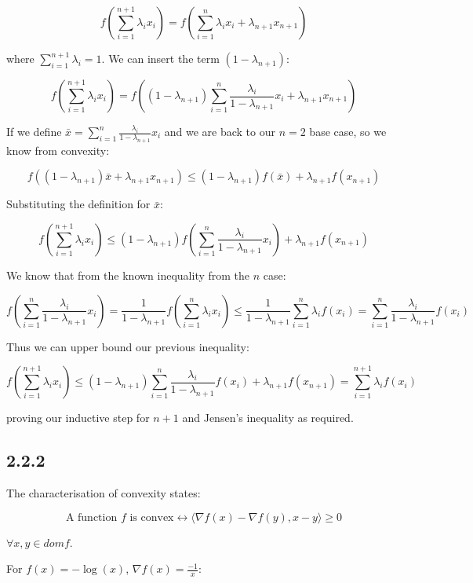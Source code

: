 \documentclass[12pt]{article}
\begin{document}
\[f\left(\sum_{i=1}^{n+1} \lambda_i x_i\right) = f\left(\sum_{i=1}^n \lambda_i x_i + \lambda_{n+1} x_{n+1}\right)\]

where $\sum_{i=1}^{n+1} \lambda_i = 1$. We can insert the term $(1-\lambda_{n+1})$:

\[f\left(\sum_{i=1}^{n+1} \lambda_i x_i\right) = f\left((1-\lambda_{n+1}) \sum_{i=1}^n \frac{\lambda_i}{1-\lambda_{n+1}} x_i + \lambda_{n+1} x_{n+1}\right)\]


If we define $\bar{x} = \sum_{i=1}^n \frac{\lambda_i}{1-\lambda_{n+1}} x_i$ and we are back to our $n=2$ base case, so we know from convexity:

\[ f\left((1-\lambda_{n+1})\bar{x} + \lambda_{n+1} x_{n+1}\right) \leq (1-\lambda_{n+1}) f\left( \bar{x}\right) + \lambda_{n+1} f\left( x_{n+1}\right)\]

Substituting the definition for $\bar{x}$:

\[f\left(\sum_{i=1}^{n+1} \lambda_i x_i\right) \leq (1-\lambda_{n+1}) f\left( \sum_{i=1}^n \frac{\lambda_i}{1-\lambda_{n+1}} x_i\right) + \lambda_{n+1} f\left( x_{n+1}\right)\]

We know that from the known inequality from the $n$ case:

\[f\left( \sum_{i=1}^n \frac{\lambda_i}{1-\lambda_{n+1}} x_i\right) = \frac{1}{{1-\lambda_{n+1}}}f\left( \sum_{i=1}^n \lambda_i x_i\right) \leq \frac{1}{{1-\lambda_{n+1}}} \sum_{i=1}^n \lambda_i f \left(x_i\right) =  \sum_{i=1}^n \frac{\lambda_i}{{1-\lambda_{n+1}}}  f \left(x_i\right)\]

Thus we can upper bound our previous inequality:


\[f\left(\sum_{i=1}^{n+1} \lambda_i x_i\right)  \leq (1-\lambda_{n+1})\sum_{i=1}^n \frac{\lambda_i}{{1-\lambda_{n+1}}}  f \left(x_i\right) + \lambda_{n+1} f\left( x_{n+1}\right) =\sum_{i=1}^{n+1} \lambda_i f \left(x_i\right) \]

proving our inductive step for $n+1$ and Jensen's inequality as required. \square


\subsection*{2.2.2}
The characterisation of convexity states:

\[\text{A function } f \text{ is convex} \leftrightarrow \langle \nabla f(x) - \nabla f(y), x-y \rangle \geq 0\]

$\forall x, y \in dom f$.

For $f(x) = -\log(x)$, $\nabla f(x) = \frac{-1}{x}$:
\end{document}
